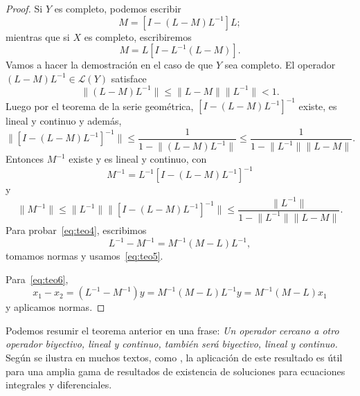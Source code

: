 \begin{proof}
	Si $Y$ es completo, podemos escribir
	\begin{equation}
		M = [I - (L - M)L^{-1}]L;
	\end{equation}
	mientras que si $X$ es completo, escribiremos
	\begin{equation}
		M = L[I - L^{-1}(L - M)].
	\end{equation}
	Vamos a hacer la demostración en el caso de que $Y$ sea completo.
	El operador $(L-M)L^{-1} \in \mathcal{L}(Y)$ satisface
	\begin{equation}
		\lVert (L - M)L^{-1} \rVert \leqslant \lVert L - M \rVert \lVert L^{-1} \rVert < 1.
	\end{equation}
	Luego por el teorema de la serie geométrica, $[I-(L-M)L^{-1}]^{-1}$ existe, es lineal y continuo y además,
	\begin{equation}
		\lVert [I-(L-M)L^{-1}]^{-1} \rVert \leqslant \dfrac{1}{1 - \lVert (L-M)L^{-1}\rVert} \leqslant \dfrac{1}{1 - \lVert L^{-1} \rVert \lVert L-M \rVert }.
	\end{equation}
	Entonces $M^{-1}$ existe y es lineal y continuo, con
	\begin{equation}
		M^{-1} = L^{-1}[I-(L-M)L^{-1}]^{-1}
	\end{equation}
	y
	\begin{equation}
		\lVert M^{-1} \rVert \leqslant \lVert L^{-1} \rVert \lVert [I-(L-M)L^{-1}]^{-1} \rVert \leqslant \dfrac{\lVert L^{-1} \rVert}{1 - \lVert L^{-1} \rVert \lVert L-M \rVert}.
	\end{equation}
	Para probar~\eqref{eq:teo4}, escribimos
	\begin{equation}
		L^{-1} - M^{-1} = M^{-1}(M-L)L^{-1},
	\end{equation}
	tomamos normas y usamos~\eqref{eq:teo5}.
	
	Para~\eqref{eq:teo6},
	\begin{equation}
		x_1 - x_2 = (L^{-1} - M^{-1})y = M^{-1}(M-L)L^{-1}y = M^{-1}(M-L)x_1
	\end{equation}
	y aplicamos normas.
\end{proof}
Podemos resumir el teorema anterior en una frase: \textit{Un operador cercano a otro operador biyectivo, lineal y continuo, también será biyectivo, lineal y continuo.} Según se ilustra en muchos textos, como \cite{Atkinson}, la aplicación de este resultado es útil para una amplia gama de resultados de existencia de soluciones para ecuaciones integrales y diferenciales.

